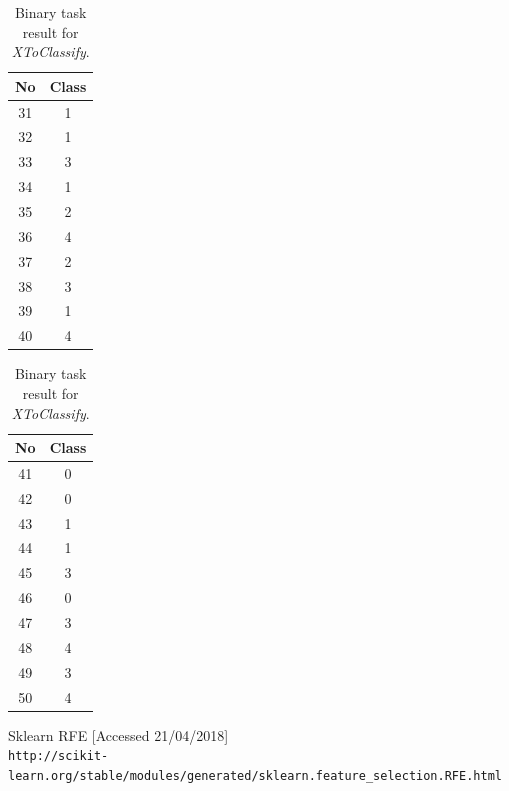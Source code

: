 \documentclass[11pt]{article}
\begin{document}
\begin{center}
\begin{table}[h]
			\begin{tabular}[b]{| c | c|} 
				\hline
				No & Class \\
				\hline
				 31 & 1 \\ 32 & 1 \\ 33 & 3 \\ 34 & 1 \\ 35 & 2 \\ 36 & 4 \\ 37 & 2 \\ 38 & 3 \\ 39 & 1 \\ 40 & 4 \\
				\hline
			\end{tabular}
			\begin{tabular}[b]{| c | c|} 
				\hline
				No & Class \\
				\hline
				 41 & 0 \\ 42 & 0 \\ 43 & 1 \\ 44 & 1 \\ 45 & 3 \\ 46 & 0 \\ 47 & 3 \\ 48 & 4 \\ 49 & 3 \\ 50 & 4 \\
				\hline
			\end{tabular}
			\caption{Binary task result for \textit{XToClassify}.}
			\label{tbl:final_binary}
			\end{table}
		\end{center}
	\clearpage

	\begin{thebibliography}{9}

		Sklearn RFE [Accessed 21/04/2018]
		\\\texttt{http://scikit-learn.org/stable/modules/generated/sklearn.feature\_selection.RFE.html}

	\end{thebibliography}
\end{document}
